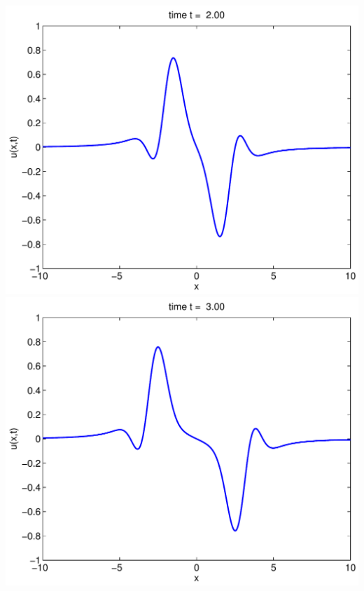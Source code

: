 {\begin{solution}
\begin{enumerate}
\begin{center}
          \includegraphics[scale=0.36]{dalembert2}\quad
          \includegraphics[scale=0.36]{dalembert3}


\end{center}
\end{enumerate}
\end{solution}}
